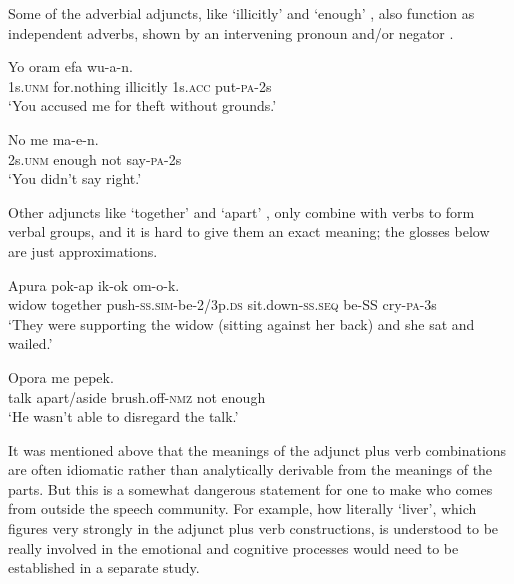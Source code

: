 Some of the adverbial adjuncts, like  `illicitly'  and  `enough' , also function as independent adverbs, shown by an intervening pronoun  and/or negator .

\ea%
\label{ex:3:x458}
\gll Yo oram  efa wu-a-n. \\
1s.\textsc{unm} for.nothing illicitly 1s.\textsc{acc} put-\textsc{pa}-2s\\
\glt`You accused me for theft without grounds.'
\z

\ea%
\label{ex:3:x459}
\gll No  me ma-e-n. \\
2s.\textsc{unm} enough not say-\textsc{pa}-2s\\
\glt`You didn't say right.'
\z

Other adjuncts like  `together'  and  `apart' , only combine with verbs to form verbal groups, and it is hard to give them an exact meaning; the glosses below are just approximations.

\ea%
\label{ex:3:x460}
\gll Apura   pok-ap ik-ok om-o-k.\\
widow together push-\textsc{ss}.\textsc{sim}-be-2/3p.\textsc{ds} sit.down-\textsc{ss}.\textsc{seq} be-SS cry-\textsc{pa}-3s\\
\glt`They were supporting the widow (sitting against her back) and she sat and wailed.'
\z

\ea%
\label{ex:3:x461}
\gll Opora   me pepek. \\
talk apart/aside brush.off-\textsc{nmz} not enough \\
\glt`He wasn't able to disregard the talk.'
\z

It was mentioned above that the meanings of the adjunct plus verb combinations are often idiomatic rather than analytically derivable from the meanings of the parts. But this is a somewhat dangerous statement for one to make who comes from outside the speech community. For example, how literally  `liver', which figures very strongly in the adjunct plus verb constructions, is understood to be really involved in the emotional and cognitive processes would need to be established in a separate study.

